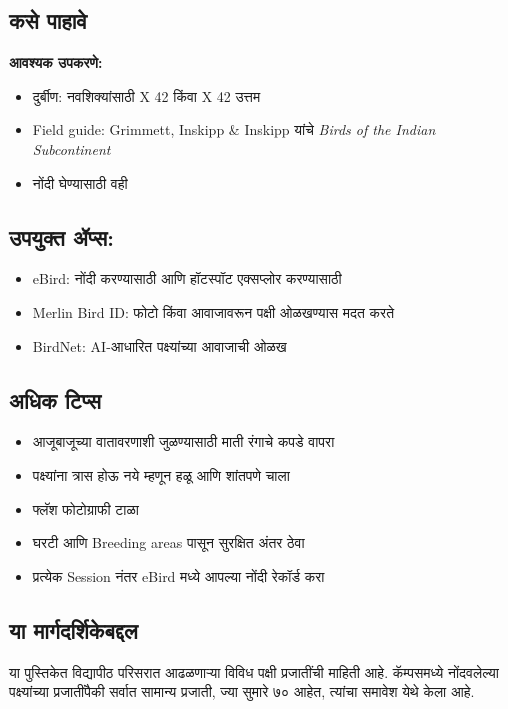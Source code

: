 \documentclass[a4paper,12pt,landscape]{memoir}
\newcommand{\introsection}[2]{%
  \begin{minipage}[t]{0.48\textwidth}
    \begin{mdframed}[
      linecolor=headingcolor,
      linewidth=1pt,
      roundcorner=5pt,
      leftmargin=0pt,
      rightmargin=0pt,
      backgroundcolor=headingcolor!5
    ]
      #1
    \end{mdframed}
  \end{minipage}\hfill
  \begin{minipage}[t]{0.48\textwidth}
    \begin{mdframed}[
      linecolor=headingcolor,
      linewidth=1pt,
      roundcorner=5pt,
      leftmargin=0pt,
      rightmargin=0pt,
      backgroundcolor=headingcolor!5
    ]
      #2
    \end{mdframed}
  \end{minipage}
  \newpage
}
\begin{document}
\introsection{%
  \section*{कसे पाहावे}
  \textbf{आवश्यक उपकरणे:}
  \begin{itemize}
  \item दुर्बीण: नवशिक्यांसाठी {\latintext 8 X 42} किंवा {\latintext 10 X 42} उत्तम
  \item {\latintext Field guide: Grimmett, Inskipp \& Inskipp} यांचे {\latintext \textit{Birds of the Indian Subcontinent}}
  \item नोंदी घेण्यासाठी वही
  \end{itemize}
}{%
  \section*{उपयुक्त ॲप्स:}
  \begin{itemize}
  \item {\latintext eBird}: नोंदी करण्यासाठी आणि हॉटस्पॉट एक्सप्लोर करण्यासाठी
  \item {\latintext Merlin Bird ID}: फोटो किंवा आवाजावरून पक्षी ओळखण्यास मदत करते
  \item {\latintext BirdNet}: {\latintext AI}-आधारित पक्ष्यांच्या आवाजाची ओळख
  \end{itemize}
}

\introsection{%
  \section*{अधिक टिप्स}
  \begin{itemize}
  \item आजूबाजूच्या वातावरणाशी जुळण्यासाठी माती रंगाचे कपडे वापरा
  \item पक्ष्यांना त्रास होऊ नये म्हणून हळू आणि शांतपणे चाला
  \item फ्लॅश फोटोग्राफी टाळा
  \item घरटी आणि {\latintext Breeding areas} पासून सुरक्षित अंतर ठेवा
  \item प्रत्येक {\latintext Session} नंतर {\latintext eBird} मध्ये आपल्या नोंदी रेकॉर्ड करा
  \end{itemize}
}{%
  \section*{या मार्गदर्शिकेबद्दल}
  या पुस्तिकेत विद्यापीठ परिसरात आढळणाऱ्या विविध पक्षी प्रजातींची माहिती आहे. कॅम्पसमध्ये नोंदवलेल्या पक्ष्यांच्या प्रजातींपैकी सर्वात सामान्य प्रजाती, ज्या सुमारे ७० आहेत, त्यांचा समावेश येथे केला आहे.
}
\end{document}
